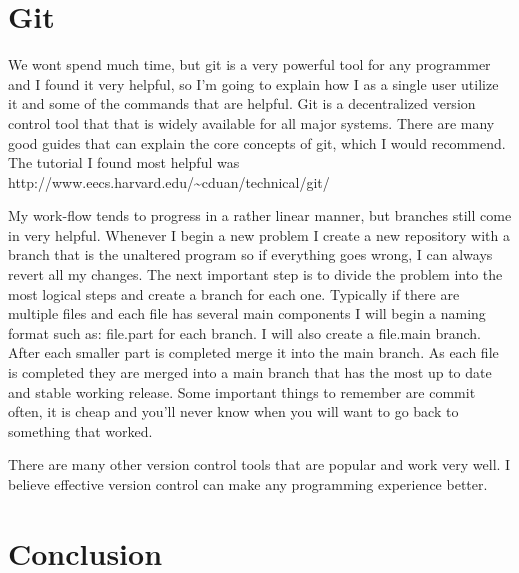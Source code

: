 \documentclass{article}
\newcommand{\comp}[1]{{\ttfamily #1}}
\begin{document}
  \section{Git}
  We wont spend much time, but git is a very powerful tool for any programmer and I found it very helpful, so I'm going to explain how I as a single user utilize it and some of the commands that are helpful. Git is a decentralized version control tool that that is widely available for all major systems. There are many good guides that can explain the core concepts of git, which I would recommend. The tutorial I found most helpful was \comp{http://www.eecs.harvard.edu/\~{}cduan/technical/git/}

My work-flow tends to progress in a rather linear manner, but branches still come in very helpful. Whenever I begin a new problem I create a new repository with a branch that is the unaltered program so if everything goes wrong, I can always revert all my changes. The next important step is to divide the problem into the most logical steps and create a branch for each one. Typically if there are multiple files and each file has several main components I will begin a naming format such as: \comp{file.part} for each branch. I will also create a \comp{file.main} branch. After each smaller part is completed merge it into the \comp{main} branch. As each file is completed they are merged into a \comp{main} branch that has the most up to date and stable working release. Some important things to remember are commit often, it is cheap and you'll never know when you will want to go back to something that worked.

There are many other version control tools that are popular and work very well. I believe effective version control can make any programming experience better.

\section{Conclusion}


\nocite{*}



\end{document}

